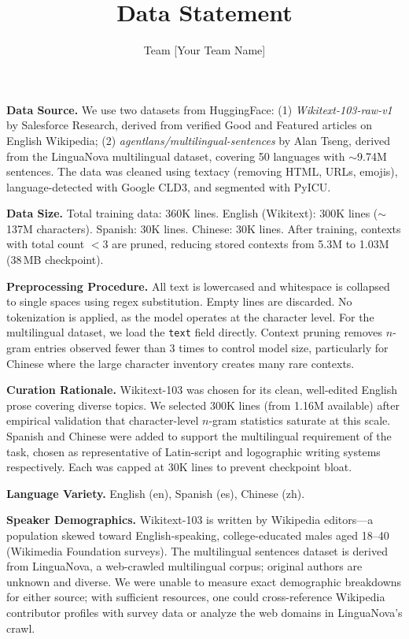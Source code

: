 \documentclass[11pt]{article}
\title{\vspace{-2em}Data Statement}
\author{Team [Your Team Name]}
\date{}
\begin{document}
\maketitle
\vspace{-2em}

\textbf{Data Source.}
We use two datasets from HuggingFace: (1) \textit{Wikitext-103-raw-v1} by Salesforce Research, derived from verified Good and Featured articles on English Wikipedia; (2) \textit{agentlans/multilingual-sentences} by Alan Tseng, derived from the LinguaNova multilingual dataset, covering 50 languages with $\sim$9.74M sentences. The data was cleaned using textacy (removing HTML, URLs, emojis), language-detected with Google CLD3, and segmented with PyICU.

\textbf{Data Size.}
Total training data: 360K lines. English (Wikitext): 300K lines ($\sim$137M characters). Spanish: 30K lines. Chinese: 30K lines. After training, contexts with total count $< 3$ are pruned, reducing stored contexts from 5.3M to 1.03M (38\,MB checkpoint).

\textbf{Preprocessing Procedure.}
All text is lowercased and whitespace is collapsed to single spaces using regex substitution. Empty lines are discarded. No tokenization is applied, as the model operates at the character level. For the multilingual dataset, we load the \texttt{text} field directly. Context pruning removes $n$-gram entries observed fewer than 3 times to control model size, particularly for Chinese where the large character inventory creates many rare contexts.

\textbf{Curation Rationale.}
Wikitext-103 was chosen for its clean, well-edited English prose covering diverse topics. We selected 300K lines (from 1.16M available) after empirical validation that character-level $n$-gram statistics saturate at this scale. Spanish and Chinese were added to support the multilingual requirement of the task, chosen as representative of Latin-script and logographic writing systems respectively. Each was capped at 30K lines to prevent checkpoint bloat.

\textbf{Language Variety.}
English (en), Spanish (es), Chinese (zh).

\textbf{Speaker Demographics.}
Wikitext-103 is written by Wikipedia editors---a population skewed toward English-speaking, college-educated males aged 18--40 (Wikimedia Foundation surveys). The multilingual sentences dataset is derived from LinguaNova, a web-crawled multilingual corpus; original authors are unknown and diverse. We were unable to measure exact demographic breakdowns for either source; with sufficient resources, one could cross-reference Wikipedia contributor profiles with survey data or analyze the web domains in LinguaNova's crawl.
\end{document}
